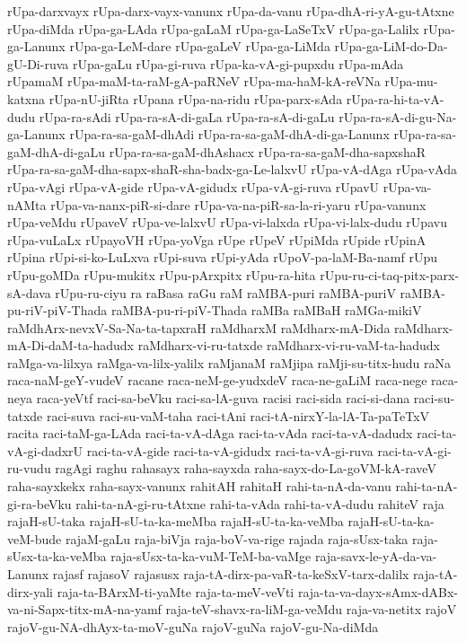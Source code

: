 {rUpa-darxvayx
rUpa-darx-vayx-vanunx
rUpa-da-vanu
rUpa-dhA-ri-yA-gu-tAtxne
rUpa-diMda
rUpa-ga-LAda
rUpa-gaLaM
rUpa-ga-LaSeTxV
rUpa-ga-Lalilx
rUpa-ga-Lanunx
rUpa-ga-LeM-dare
rUpa-gaLeV
rUpa-ga-LiMda
rUpa-ga-LiM-do-Da-gU-Di-ruva
rUpa-gaLu
rUpa-gi-ruva
rUpa-ka-vA-gi-pupxdu
rUpa-mAda
rUpamaM
rUpa-maM-ta-raM-gA-paRNeV
rUpa-ma-haM-kA-reVNa
rUpa-mu-katxna
rUpa-nU-jiRta
rUpana
rUpa-na-ridu
rUpa-parx-sAda
rUpa-ra-hi-ta-vA-dudu
rUpa-ra-sAdi
rUpa-ra-sA-di-gaLa
rUpa-ra-sA-di-gaLu
rUpa-ra-sA-di-gu-Na-ga-Lanunx
rUpa-ra-sa-gaM-dhAdi
rUpa-ra-sa-gaM-dhA-di-ga-Lanunx
rUpa-ra-sa-gaM-dhA-di-gaLu
rUpa-ra-sa-gaM-dhAshacx
rUpa-ra-sa-gaM-dha-sapxshaR
rUpa-ra-sa-gaM-dha-sapx-shaR-sha-badx-ga-Le-lalxvU
rUpa-vA-dAga
rUpa-vAda
rUpa-vAgi
rUpa-vA-gide
rUpa-vA-gidudx
rUpa-vA-gi-ruva
rUpavU
rUpa-va-nAMta
rUpa-va-nanx-piR-si-dare
rUpa-va-na-piR-sa-la-ri-yaru
rUpa-vanunx
rUpa-veMdu
rUpaveV
rUpa-ve-lalxvU
rUpa-vi-lalxda
rUpa-vi-lalx-dudu
rUpavu
rUpa-vuLaLx
rUpayoVH
rUpa-yoVga
rUpe
rUpeV
rUpiMda
rUpide
rUpinA
rUpina
rUpi-si-ko-LuLxva
rUpi-suva
rUpi-yAda
rUpoV-pa-laM-Ba-namf
rUpu
rUpu-goMDa
rUpu-mukitx
rUpu-pArxpitx
rUpu-ra-hita
rUpu-ru-ci-taq-pitx-parx-sA-dava
rUpu-ru-ciyu
ra
raBasa
raGu
raM
raMBA-puri
raMBA-puriV
raMBA-pu-riV-piV-Thada
raMBA-pu-ri-piV-Thada
raMBa
raMBaH
raMGa-mikiV
raMdhArx-nevxV-Sa-Na-ta-tapxraH
raMdharxM
raMdharx-mA-Dida
raMdharx-mA-Di-daM-ta-hadudx
raMdharx-vi-ru-tatxde
raMdharx-vi-ru-vaM-ta-hadudx
raMga-va-lilxya
raMga-va-lilx-yalilx
raMjanaM
raMjipa
raMji-su-titx-hudu
raNa
raca-naM-geY-vudeV
racane
raca-neM-ge-yudxdeV
raca-ne-gaLiM
raca-nege
raca-neya
raca-yeVtf
raci-sa-beVku
raci-sa-lA-guva
racisi
raci-sida
raci-si-dana
raci-su-tatxde
raci-suva
raci-su-vaM-taha
raci-tAni
raci-tA-nirxY-la-lA-Ta-paTeTxV
racita
raci-taM-ga-LAda
raci-ta-vA-dAga
raci-ta-vAda
raci-ta-vA-dadudx
raci-ta-vA-gi-dadxrU
raci-ta-vA-gide
raci-ta-vA-gidudx
raci-ta-vA-gi-ruva
raci-ta-vA-gi-ru-vudu
ragAgi
raghu
rahasayx
raha-sayxda
raha-sayx-do-La-goVM-kA-raveV
raha-sayxkekx
raha-sayx-vanunx
rahitAH
rahitaH
rahi-ta-nA-da-vanu
rahi-ta-nA-gi-ra-beVku
rahi-ta-nA-gi-ru-tAtxne
rahi-ta-vAda
rahi-ta-vA-dudu
rahiteV
raja
rajaH-sU-taka
rajaH-sU-ta-ka-meMba
rajaH-sU-ta-ka-veMba
rajaH-sU-ta-ka-veM-bude
rajaM-gaLu
raja-biVja
raja-boV-va-rige
rajada
raja-sUsx-taka
raja-sUsx-ta-ka-veMba
raja-sUsx-ta-ka-vuM-TeM-ba-vaMge
raja-savx-le-yA-da-va-Lanunx
rajasf
rajasoV
rajasusx
raja-tA-dirx-pa-vaR-ta-keSxV-tarx-dalilx
raja-tA-dirx-yali
raja-ta-BArxM-ti-yaMte
raja-ta-meV-veVti
raja-ta-va-dayx-sAmx-dABx-va-ni-Sapx-titx-mA-na-yamf
raja-teV-shavx-ra-liM-ga-veMdu
raja-va-netitx
rajoV
rajoV-gu-NA-dhAyx-ta-moV-guNa
rajoV-guNa
rajoV-gu-Na-diMda
}
